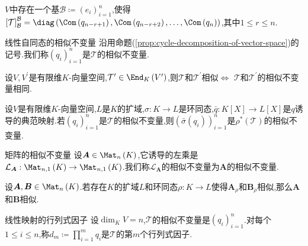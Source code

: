 \begin{remark}{}{}
	$V$中存在一个基$\mathcal{B}\coloneq\left(e_{i}\right)_{i=1}^{n}$,使得$\left[\mathcal{T}\right]_{\mathcal{B}}^{\mathcal{B}}=\diag\left(\Com\left(q_{n-r+1}\right),\Com\left(q_{n-r+2}\right),\ldots,\Com\left(q_{n}\right)\right)$,其中$1\leq r\leq n$.
\end{remark}

\begin{definition}{线性自同态的相似不变量}{}
	沿用命题(\cref{prop:cycle-decomposition-of-vector-space})的记号.我们称$\left(q_{i}\right)_{i=1}^{n}$是$\mathcal{T}$的相似不变量.
\end{definition}

\begin{corollary}{}{}
	设$V,V^{\prime}$是有限维$K$-向量空间,$\mathcal{T}^{\prime}\in\End_{K}\left(V^{\prime}\right)$,则$\mathcal{T}$和$\mathcal{T}^{\prime}$相似$\iff$ $\mathcal{T}$和$\mathcal{T}^{\prime}$的相似不变量相同.
\end{corollary}

\begin{corollary}{}{}
	设$V$是有限维$K$-向量空间,$L$是$K$的扩域,$\sigma:K\to L$是环同态,$\bar{q}:K[X]\to L[X]$是$q$诱导的典范映射.若$\left(q_{i}\right)_{i=1}^{n}$是$\mathcal{T}$的相似不变量,则$\left(\bar{\sigma}\left(q_{i}\right)\right)_{i=1}^{n}$是$\rho^{\ast}\left(\mathcal{T}\right)$的相似不变量.
\end{corollary}

\begin{definition}{矩阵的相似不变量}{}
	设$\boldsymbol{A}\in\Mat_{n}\left(K\right)$,它诱导的左乘是$\mathcal{L}_{\boldsymbol{A}}:\Mat_{n,1}\left(K\right)\to\Mat_{n,1}\left(K\right)$.我们称$\mathcal{L}_{\boldsymbol{A}}$的相似不变量为$\boldsymbol{A}$的相似不变量.
\end{definition}

\begin{corollary}{}{}
	设$\boldsymbol{A},\boldsymbol{B}\in\Mat_{n}\left(K\right)$.若存在$K$的扩域$L$和环同态$\rho:K\to L$使得$\boldsymbol{A}_{\rho}$和$\boldsymbol{B}_{\rho}$相似,那么$\boldsymbol{A}$和$\boldsymbol{B}$相似.
\end{corollary}

\begin{definition}{线性映射的行列式因子}{}
	设$\dim_{K}V=n$,$\mathcal{T}$的相似不变量是$\left(q_{i}\right)_{i=1}^{n}$.对每个$1\leq i\leq n$,称$d_{m}\coloneq\prod\limits_{i=1}^{m}q_{i}$是$\mathcal{T}$的第$m$个行列式因子.
\end{definition}

